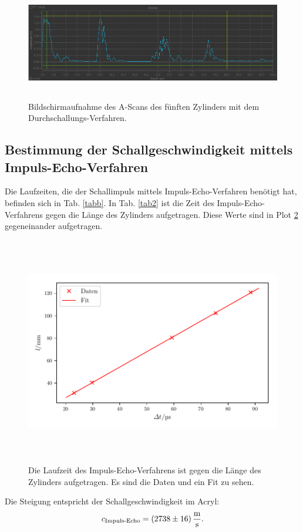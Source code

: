 \begin{figure}
    \centering
    \includegraphics[width=15cm, height=5cm]{build/Messung3.5.png}
    \caption{Bildschirmaufnahme des A-Scans des fünften Zylinders mit dem Durchschallungs-Verfahren.}
    \label{fig:m3.5}
\end{figure}

\subsection{Bestimmung der Schallgeschwindigkeit mittels Impuls-Echo-Verfahren}
Die Laufzeiten, die der Schallimpuls mittels Impuls-Echo-Verfahren benötigt hat,
befinden sich in Tab. \ref{tabb}. In Tab. \ref{tab2} ist die Zeit des Impuls-Echo-Verfahrens
gegen die Länge des Zylinders aufgetragen. Diese Werte sind in Plot \ref{fig:plot2}
gegeneinander aufgetragen.


\begin{figure}
    \centering
    \includegraphics[width=15cm, height=10cm]{build/plot2.pdf}
    \caption{Die Laufzeit des Impuls-Echo-Verfahrens ist gegen die Länge des Zylinders
    aufgetragen. Es sind die Daten und ein Fit zu sehen.}
    \label{fig:plot2}
\end{figure}
\noindent Die Steigung entspricht der Schallgeschwindigkeit im Acryl:
\begin{equation*}
    c_{\text{Impuls-Echo}} = \SI{2738 \pm 16}{\meter\per\second}.
\end{equation*}


